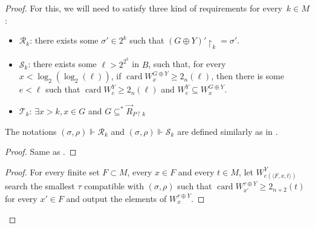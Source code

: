 \documentclass{article}
\newcommand{\uh}{\upharpoonright}
\newcommand{\card}{\operatorname{card}}
\numberwithin{theorem}{section}
\newtheorem{lemma}[theorem]{Lemma}
\begin{document}
\begin{proof}
For this, we will need to satisfy three kind of requirements for every~$k \in M$:
\begin{itemize}
    \item $\mathcal{R}_k$: there exists some $\sigma' \in 2^k$ such that $(G \oplus Y)' \uh_k = \sigma'$.
    \item $\mathcal{S}_{k}$: there exists some $\ell > 2^{2^k}$ in $B$, such that, for every $x < \log_2(\log_2(\ell))$, if $\card W^{G \oplus Y}_x \geq 2_n(\ell)$, then there is some $e < \ell$ such that $\card W^Y_e \geq 2_n(\ell)$ and $W^Y_e \subseteq W_x^{G \oplus Y}$.
    \item $\mathcal{T}_k$: $\exists x > k, x \in G$ and $G \subseteq^* \vec{R}_{P \uh k}$
\end{itemize}

The notations $(\sigma, \rho) \Vdash \mathcal{R}_k$ and $(\sigma, \rho) \Vdash \mathcal{S}_k$ are defined similarly as in .


\begin{proof}
Same as \cite[Lemma 2.11]{houerou2025conservation}.
\end{proof}


\begin{proof}
For every finite set $F \subset M$, every $x \in F$ and every $t \in M$, let $W_{e(\langle F, x,t \rangle)}^Y$ search the smallest $\tau$ compatible with $(\sigma, \rho)$ such that $\card W^{\tau \oplus Y}_{x'} \geq 2_{n+2}(t)$ for every $x' \in F$ and output the elements of $W^{\tau \oplus Y}_{x}$. 


\end{proof}
\end{proof}
\end{document}
